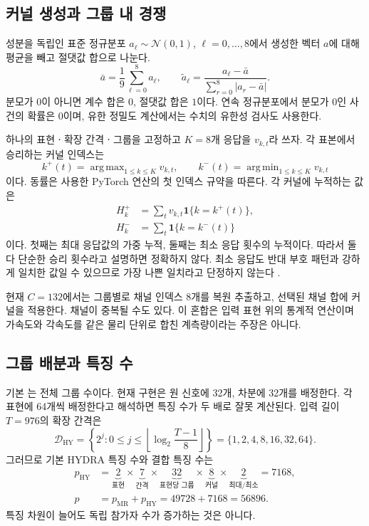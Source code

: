 \documentclass[11pt,a4paper]{article}
\newcommand{\ind}{\mathbf{1}}
\newcommand{\code}[1]{\texttt{\detokenize{#1}}}
\DeclareMathOperator{\MR}{MR}
\DeclareMathOperator{\HY}{HY}
\DeclareMathOperator*{\argmax}{arg\,max}
\DeclareMathOperator*{\argmin}{arg\,min}
\numberwithin{equation}{section}
\begin{document}
\subsection{커널 생성과 그룹 내 경쟁}
성분을 독립인 표준 정규분포
\(a_\ell\sim\mathcal N(0,1)\), \(\ell=0,\ldots,8\)에서 생성한 벡터 \(a\)에 대해
평균을 빼고 절댓값 합으로 나눈다.
\begin{equation}
 \bar a=\frac19\sum_{\ell=0}^{8}a_\ell,\qquad
 \widetilde a_\ell=\frac{a_\ell-\bar a}
 {\sum_{r=0}^{8}|a_r-\bar a|}.
\end{equation}
분모가 \(0\)이 아니면 계수 합은 \(0\), 절댓값 합은 \(1\)이다.
연속 정규분포에서 분모가 \(0\)인 사건의 확률은 \(0\)이며,
유한 정밀도 계산에서는 수치의 유한성 검사도 사용한다.

하나의 표현ㆍ확장 간격ㆍ그룹을 고정하고 \(K=8\)개 응답을 \(v_{k,t}\)라 쓰자.
각 표본에서 승리하는 커널 인덱스는
\begin{equation}
 k^+(t)=\argmax_{1\leq k\leq K}v_{k,t},\qquad
 k^-(t)=\argmin_{1\leq k\leq K}v_{k,t}
\end{equation}
이다. 동률은 사용한 PyTorch 연산의 첫 인덱스 규약을 따른다.
각 커널에 누적하는 값은
\begin{align}
 H^+_k&=\sum_t v_{k,t}\ind\{k=k^+(t)\},\\
 H^-_k&=\sum_t\ind\{k=k^-(t)\}
\end{align}
이다. 첫째는 최대 응답값의 가중 누적, 둘째는 최소 응답 횟수의 누적이다.
따라서 둘 다 단순한 승리 횟수라고 설명하면 정확하지 않다.
최소 응답도 반대 부호 패턴과 강하게 일치한 값일 수 있으므로
가장 나쁜 일치라고 단정하지 않는다 \cite{hydra,aeonhydra}.

현재 \(C=132\)에서는 그룹별로 채널 인덱스 8개를 복원 추출하고,
선택된 채널 합에 커널을 적용한다. 채널이 중복될 수도 있다.
이 혼합은 입력 표현 위의 통계적 연산이며
가속도와 각속도를 같은 물리 단위로 합친 계측량이라는 주장은 아니다.

\subsection{그룹 배분과 특징 수}
기본 \code{hydra_groups=64}는 전체 그룹 수이다.
현재 구현은 원 신호에 32개, 차분에 32개를 배정한다.
각 표현에 64개씩 배정한다고 해석하면 특징 수가 두 배로 잘못 계산된다.
입력 길이 \(T=976\)의 확장 간격은
\begin{equation}
 \mathcal D_{\HY}
 =\left\{2^j:0\leq j\leq\left\lfloor\log_2\frac{T-1}{8}\right\rfloor\right\}
 =\{1,2,4,8,16,32,64\}.
\end{equation}
그러므로 기본 HYDRA 특징 수와 결합 특징 수는
\begin{align}
 p_{\HY}
 &=\underbrace2_{\text{표현}}\times\underbrace7_{\text{간격}}
 \times\underbrace{32}_{\text{표현당 그룹}}
 \times\underbrace8_{\text{커널}}\times\underbrace2_{\text{최대/최소}}
 =7168,\\
 p&=p_{\MR}+p_{\HY}=49728+7168=56896.
\end{align}
특징 차원이 늘어도 독립 참가자 수가 증가하는 것은 아니다.
\end{document}
